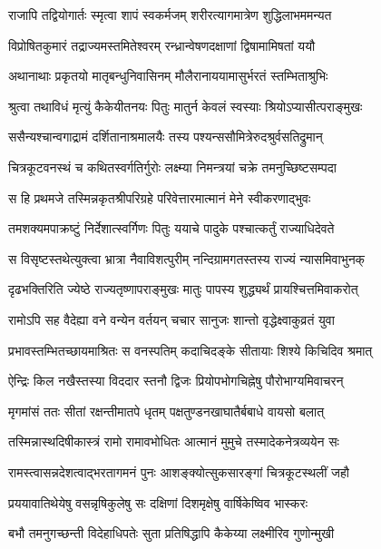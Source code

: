 \twolineshloka
{राजापि तद्वियोगार्तः स्मृत्वा शापं स्वकर्मजम्}
{शरीरत्यागमात्रेण शुद्धिलाभममन्यत} %

\twolineshloka
{विप्रोषितकुमारं तद्राज्यमस्तमितेश्वरम्}
{रन्ध्रान्वेषणदक्षाणां द्विषामामिषतां ययौ} %

\twolineshloka
{अथानाथाः प्रकृतयो मातृबन्धुनिवासिनम्}
{मौलैरानाययामासुर्भरतं स्तम्भिताश्रुभिः} %

\twolineshloka
{श्रुत्वा तथाविधं मृत्युं कैकेयीतनयः पितुः}
{मातुर्न केवलं स्वस्याः श्रियोऽप्यासीत्पराङ्मुखः} %

\twolineshloka
{ससैन्यश्चान्वगाद्रामं दर्शितानाश्रमालयैः}
{तस्य पश्यन्ससौमित्रेरुदश्रुर्वसतिद्रुमान्} %

\twolineshloka
{चित्रकूटवनस्थं च कथितस्वर्गतिर्गुरोः}
{लक्ष्म्या निमन्त्रयां चक्रे तमनुच्छिष्टसम्पदा} %

\twolineshloka
{स हि प्रथमजे तस्मिन्नकृतश्रीपरिग्रहे}
{परिवेत्तारमात्मानं मेने स्वीकरणाद्भुवः} %

\twolineshloka
{तमशक्यमपाक्रष्टुं निर्देशात्स्वर्गिणः पितुः}
{ययाचे पादुके पश्चात्कर्तुं राज्याधिदेवते} %

\twolineshloka
{स विसृष्टस्तथेत्युक्त्वा भ्रात्रा नैवाविशत्पुरीम्}
{नन्दिग्रामगतस्तस्य राज्यं न्यासमिवाभुनक्} %

\twolineshloka
{दृढभक्तिरिति ज्येष्ठे राज्यतृष्णापराङ्मुखः}
{मातुः पापस्य शुद्ध्यर्थं प्रायश्चित्तमिवाकरोत्} %

\twolineshloka
{रामोऽपि सह वैदेह्या वने वन्येन वर्तयन्}
{चचार सानुजः शान्तो वृद्धेक्ष्वाकुव्रतं युवा} %

\twolineshloka
{प्रभावस्तम्भितच्छायमाश्रितः स वनस्पतिम्}
{कदाचिदङ्के सीतायाः शिश्ये किचिदिव श्रमात्} %

\twolineshloka
{ऐन्द्रिः किल नखैस्तस्या विददार स्तनौ द्विजः}
{प्रियोपभोगचिह्नेषु पौरोभाग्यमिवाचरन्} %

\twolineshloka
{मृगमांसं ततः सीतां रक्षन्तीमातपे धृतम्}
{पक्षतुण्डनखाघातैर्बबाधे वायसो बलात्} %

\twolineshloka
{तस्मिन्नास्थदिषीकास्त्रं रामो रामावभोधितः}
{आत्मानं मुमुचे तस्मादेकनेत्रव्ययेन सः} %

\twolineshloka
{रामस्त्वासन्नदेशत्वाद्भरतागमनं पुनः}
{आशङ्क्योत्सुकसारङ्गां चित्रकूटस्थलीं जहौ} %

\twolineshloka
{प्रययावातिथेयेषु वसन्नृषिकुलेषु सः}
{दक्षिणां दिशमृक्षेषु वार्षिकेष्विव भास्करः} %

\twolineshloka
{बभौ तमनुगच्छन्ती विदेहाधिपतेः सुता}
{प्रतिषिद्धापि कैकेय्या लक्ष्मीरिव गुणोन्मुखी} %


